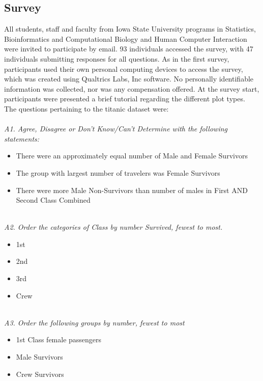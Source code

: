 \subsection*{Survey }\label{app2}
All students, staff and faculty from Iowa State University programs in Statistics, Bioinformatics and Computational Biology and Human Computer Interaction were invited to participate by email. 93 individuals accessed the survey, with 47 individuals submitting responses for all questions. As in the first survey, participants used their own personal computing devices to access the survey, which was created using Qualtrics Labs, Inc software. No personally identifiable information was collected, nor was any compensation offered. At the survey start, participants were presented a brief tutorial regarding the different plot types.  \\

\noindent The questions pertaining to the titanic dataset were: \\ \\
\emph{A1. Agree, Disagree or Don't Know/Can't Determine with the following statements:}
\begin{itemize}
\item There were an approximately equal number of Male and Female Survivors
\item The group with largest number of travelers was Female Survivors
\item There were more Male Non-Survivors than number of males in First AND Second Class Combined
\end{itemize}

\noindent \\ \emph{A2. Order the categories of Class by number Survived, fewest to most.} 
\begin{itemize}
\item 1st
\item 2nd 
\item 3rd
\item Crew
\end{itemize}

\noindent \\ \emph{A3. Order the following groups by number, fewest to most}
\begin{itemize}
\item 1st Class female passengers
\item Male Survivors
\item Crew Survivors
\end{itemize}


